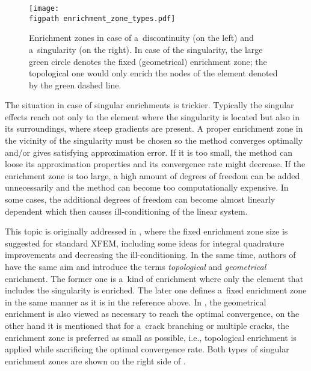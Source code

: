 \begin{figure}[!htb]
  \centering    
    \texttt{[image: \\figpath enrichment\_zone\_types.pdf]}
  \caption[Enrichment zone types]{Enrichment zones in case of a~discontinuity (on the left) and a~singularity (on the right).
  In case of the singularity, the large green circle denotes the fixed (geometrical) enrichment zone; the topological one would
  only enrich the nodes of the element denoted by the green dashed line.}
  \label{fig:enrichment_zone_types}
\end{figure}
The situation in case of singular enrichments is trickier.
Typically the singular effects reach not only to the element where the singularity is located but also in its surroundings,
where steep gradients are present.
A proper enrichment zone in the vicinity of the singularity must be chosen so the method converges optimally
and/or gives satisfying approximation error. If it is too
small, the method can loose its approximation properties and its convergence rate might decrease. If the enrichment zone is too large,
a high amount of degrees of freedom can be added unnecessarily and the method can become too computationally expensive.
In some cases, the additional degrees of freedom can become almost linearly dependent which then causes ill-conditioning of the linear system.

This topic is originally addressed in \cite{laborde_highorder_2005}, where the fixed enrichment zone size is suggested for standard XFEM,
including some ideas for integral quadrature improvements and decreasing the ill-conditioning. In the same time, authors of \cite{bechet_improved_2005}
have the same aim and introduce the terms \emph{topological} and \emph{geometrical} enrichment. The former one is a~kind of enrichment where only the element
that includes the singularity is enriched. The later one defines a~fixed enrichment zone in the same manner as it is in the reference above.
In \cite{fries_corrected_2008}, the geometrical enrichment is also viewed as necessary to reach the optimal convergence, on the other hand
it is mentioned that for a~crack branching or multiple cracks, the enrichment zone is preferred as small as possible, i.e., topological enrichment is applied
while sacrificing the optimal convergence rate.
Both types of singular enrichment zones are shown on the right side of .

